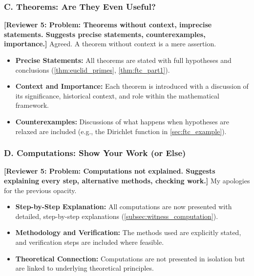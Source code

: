 \documentclass[11pt, a4paper]{article}
\theoremstyle{plain} %
\theoremstyle{definition} %
\theoremstyle{remark} %
\newcommand{\reviewer}[1]{\textcolor{reviewercolor}{\textbf{[Reviewer 5: #1]}}}
\begin{document}
\subsubsection*{C. Theorems: Are They Even Useful?}
\reviewer{Problem: Theorems without context, imprecise statements. Suggests precise statements, counterexamples, importance.}
Agreed. A theorem without context is a mere assertion.
\begin{itemize}
    \item \textbf{Precise Statements:} All theorems are stated with full hypotheses and conclusions (\ref{thm:euclid_primes}, \ref{thm:ftc_part1}).
    \item \textbf{Context and Importance:} Each theorem is introduced with a discussion of its significance, historical context, and role within the mathematical framework.
    \item \textbf{Counterexamples:} Discussions of what happens when hypotheses are relaxed are included (e.g., the Dirichlet function in \ref{sec:ftc_example}).

\end{itemize}
\subsubsection*{D. Computations: Show Your Work (or Else)}
\reviewer{Problem: Computations not explained. Suggests explaining every step, alternative methods, checking work.}
My apologies for the previous opacity.
\begin{itemize}
    \item \textbf{Step-by-Step Explanation:} All computations are now presented with detailed, step-by-step explanations (\ref{subsec:witness_computation}).
    \item \textbf{Methodology and Verification:} The methods used are explicitly stated, and verification steps are included where feasible.
    \item \textbf{Theoretical Connection:} Computations are not presented in isolation but are linked to underlying theoretical principles.

\end{itemize}
\end{document}
